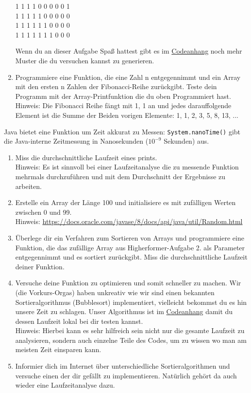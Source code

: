 \documentclass{../../sheet}
\begin{document}
\begin{enumerate}
\begin{ausgabe}
              1 1 1 1 0 0 0 0 0 1 \\
              1 1 1 1 1 0 0 0 0 0 \\
              1 1 1 1 1 1 0 0 0 0 \\
              1 1 1 1 1 1 1 0 0 0
          \end{ausgabe}
          Wenn du an dieser Aufgabe Spaß hattest gibt es im \hyperlink{Aufgabe_4}{Codeanhang} noch mehr Muster die du versuchen kannst zu generieren.
    \item Programmiere eine Funktion, die eine Zahl n entgegennimmt und ein Array mit den ersten n Zahlen der Fibonacci-Reihe zurückgibt. Teste dein Programm mit der Array-Printfunktion die du oben Programmiert hast.\\
          Hinweis: Die Fibonacci Reihe fängt mit 1, 1 an und jedes darauffolgende Element ist die Summe der Beiden vorigen Elemente: 1, 1, 2, 3, 5, 8, 13, ...

\end{enumerate}

\newpage
{}
Java bietet eine Funktion um Zeit akkurat zu Messen: \texttt{System.nanoTime()} gibt die Java-interne Zeitmessung in Nanosekunden ($10^{-9}$ Sekunden) aus.
\begin{enumerate}
    \item Miss die durchschnittliche Laufzeit eines prints.\\
          Hinweis: Es ist sinnvoll bei einer Laufzeitanalyse die zu messende Funktion mehrmals durchzuführen und mit dem Durchschnitt der Ergebnisse zu arbeiten.
    \item Erstelle ein Array der Länge 100 und initialisiere es mit zufälligen Werten zwischen 0 und 99.\\
          Hinweis: \url{https://docs.oracle.com/javase/8/docs/api/java/util/Random.html}
    \item Überlege dir ein Verfahren zum Sortieren von Arrays und programmiere eine Funktion, die das zufällige Array aus Higherformer-Aufgabe 2. als Parameter entgegennimmt und es sortiert zurückgibt. Miss die durchschnittliche Laufzeit deiner Funktion.
    \item Versuche deine Funktion zu optimieren und somit schneller zu machen. Wir (die Vorkurs-Orgas) haben unkreativ wie wir sind einen bekannten Sortieralgorithmus (Bubblesort) implementiert, vielleicht bekommst du es hin unsere Zeit zu schlagen. Unser Algorithmus ist im \hyperlink{Highperformer}{Codeanhang} damit du dessen Laufzeit lokal bei dir testen kannst.\\
          Hinweis: Hierbei kann es sehr hilfreich sein nicht nur die gesamte Laufzeit zu analysieren, sondern auch einzelne Teile des Codes, um zu wissen wo man am meisten Zeit einsparen kann.
    \item Informier dich im Internet über unterschiedliche Sortieralgorithmen und versuche einen der dir gefällt zu implementieren. Natürlich gehört da auch wieder eine Laufzeitanalyse dazu.
\end{enumerate}
\end{document}
